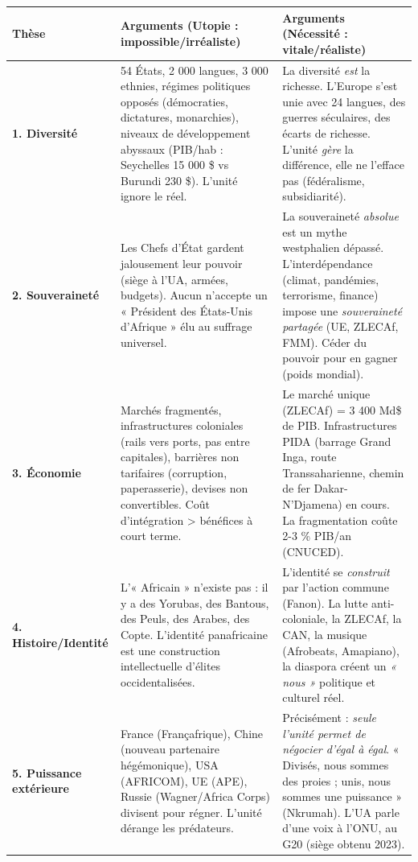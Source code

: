 \documentclass[11pt]{article}
\begin{document}
\begin{center}
\begin{tabularx}{\linewidth}{|l|X|X|}\hline
\rowcolor{popblueL}
\textbf{Thèse} & \textbf{Arguments (Utopie : impossible/irréaliste)} & \textbf{Arguments (Nécessité : vitale/réaliste)} \\ \hline
\textbf{1. Diversité} & 54 États, 2 000 langues, 3 000 ethnies, régimes politiques opposés (démocraties, dictatures, monarchies), niveaux de développement abyssaux (PIB/hab : Seychelles 15 000 \$ vs Burundi 230 \$). L'unité ignore le réel. & La diversité \emph{est} la richesse. L'Europe s'est unie avec 24 langues, des guerres séculaires, des écarts de richesse. L'unité \emph{gère} la différence, elle ne l'efface pas (fédéralisme, subsidiarité). \\ \hline
\textbf{2. Souveraineté} & Les Chefs d'État gardent jalousement leur pouvoir (siège à l'UA, armées, budgets). Aucun n'accepte un « Président des États-Unis d'Afrique » élu au suffrage universel. & La souveraineté \emph{absolue} est un mythe westphalien dépassé. L'interdépendance (climat, pandémies, terrorisme, finance) impose une \emph{souveraineté partagée} (UE, ZLECAf, FMM). Céder du pouvoir pour en gagner (poids mondial). \\ \hline
\textbf{3. Économie} & Marchés fragmentés, infrastructures coloniales (rails vers ports, pas entre capitales), barrières non tarifaires (corruption, paperasserie), devises non convertibles. Coût d'intégration > bénéfices à court terme. & Le marché unique (ZLECAf) = 3 400 Md\$ de PIB. Infrastructures PIDA (barrage Grand Inga, route Transsaharienne, chemin de fer Dakar-N'Djamena) en cours. La fragmentation coûte 2-3 \% PIB/an (CNUCED). \\ \hline
\textbf{4. Histoire/Identité} & L'« Africain » n'existe pas : il y a des Yorubas, des Bantous, des Peuls, des Arabes, des Copte. L'identité panafricaine est une construction intellectuelle d'élites occidentalisées. & L'identité se \emph{construit} par l'action commune (Fanon). La lutte anti-coloniale, la ZLECAf, la CAN, la musique (Afrobeats, Amapiano), la diaspora créent un \emph{« nous »} politique et culturel réel. \\ \hline
\textbf{5. Puissance extérieure} & France (Françafrique), Chine (nouveau partenaire hégémonique), USA (AFRICOM), UE (APE), Russie (Wagner/Africa Corps) divisent pour régner. L'unité dérange les prédateurs. & Précisément : \emph{seule l'unité permet de négocier d'égal à égal}. « Divisés, nous sommes des proies ; unis, nous sommes une puissance » (Nkrumah). L'UA parle d'une voix à l'ONU, au G20 (siège obtenu 2023). \\ \hline
\end{tabularx}
\end{center}
\end{document}
